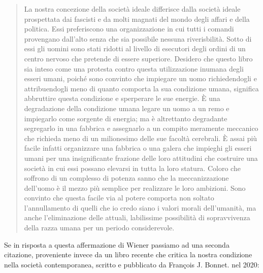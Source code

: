 \begin{quote}
    La nostra concezione della società ideale differisce dalla società ideale
    prospettata dai fascisti e da molti magnati del mondo degli affari 
    e della politica.
    Essi preferiscono una organizzazione in cui tutti i comandi
    provengano dall'alto senza che sia possibile nessuna riverisbilità.
    Sotto di essi gli uomini sono stati ridotti al livello di esecutori degli ordini
    di un centro nervoso che pretende di essere superiore.
    Desidero che questo libro sia inteso come una protesta contro questa
    utilizzazione inumana degli esseri umani, poiché sono convinto che impiegare
    un uomo richiedendogli e attribuendogli meno di quanto comporta la sua condizione umana,
    significa abbruttire questa condizione e sperperare le sue energie.
    È una degradazione della condizione umana legare un uomo a un remo e impiegarlo come
    sorgente di energia; ma è altrettanto degradante segregarlo in una fabbrica
    e assegnarlo a un compito meramente meccanico che richieda meno di un milionesimo
    delle sue facoltà cerebrali. È assai più facile infatti
    organizzare una fabbrica o una galera che impieghi gli esseri umani
    per una insignificante frazione delle loro attitudini che costruire una 
    società in cui essi possano elevarsi in tutta la loro statura.
    Coloro che soffrono di un complesso di potenza sanno che la meccanizzazione 
    dell'uomo è il mezzo più semplice per realizzare le loro ambizioni.
    Sono convinto che questa facile via al potere comporta non soltato l'annullamento 
    di quelli che io credo siano i valori morali dell'umanità,
    ma anche l'eliminazione delle attuali, labilissime possibilità di
    sopravvivenza della razza umana per un periodo considerevole.
\end{quote}

Se in risposta a questa affermazione di Wiener passiamo ad una seconda citazione, proveniente invece da un libro 
recente che critica la nostra condizione nella società contemporanea, scritto e pubblicato da François J. Bonnet. nel 2020:

